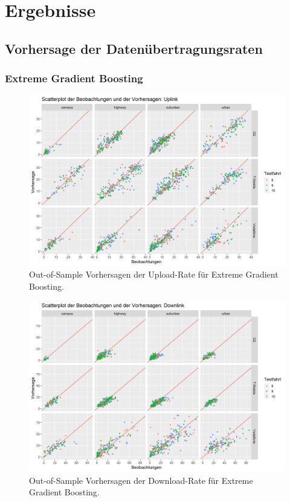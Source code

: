 \section{Ergebnisse}

\subsection{Vorhersage der Daten\"ubertragungsraten}

\subsubsection{Extreme Gradient Boosting}

\begin{figure}
    \centering
    \includegraphics[width=\textwidth]{abbildungen/xgboost_predictions_ul}
    \caption{Out-of-Sample Vorhersagen der Upload-Rate f\"ur Extreme Gradient Boosting.}
    \label{fig:xgboost-ul}
\end{figure}

\begin{figure}
    \centering
    \includegraphics[width=\textwidth]{abbildungen/xgboost_predictions_dl}
    \caption{Out-of-Sample Vorhersagen der Download-Rate f\"ur Extreme Gradient Boosting.}
    \label{fig:xgboost-dl}
\end{figure}

